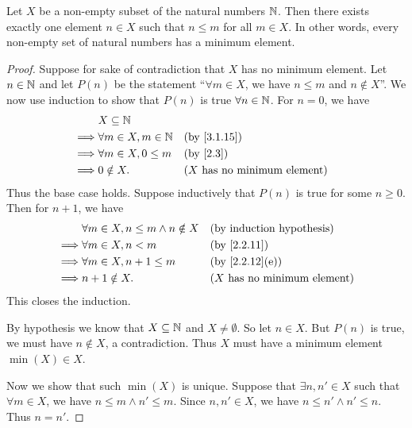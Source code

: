 \begin{prop}\label{8.1.4}
	Let \(X\) be a non-empty subset of the natural numbers \(\mathbb{N}\).
	Then there exists exactly one element \(n \in X\) such that \(n \leq m\) for all \(m \in X\).
	In other words, every non-empty set of natural numbers has a minimum element.
\end{prop}

\begin{proof}
	Suppose for sake of contradiction that \(X\) has no minimum element.
	Let \(n \in \mathbb{N}\) and let \(P(n)\) be the statement ``\(\forall m \in X\), we have \(n \leq m\) and \(n \notin X\)''.
	We now use induction to show that \(P(n)\) is true \(\forall n \in \mathbb{N}\).
	For \(n = 0\), we have
	\begin{align*}
		         & X \subseteq \N                                                       \\
		\implies & \forall m \in X, m \in \N &  & \by{3.1.15}                           \\
		\implies & \forall m \in X, 0 \leq m &  & \by{2.3}                              \\
		\implies & 0 \notin X.               &  & \text{(\(X\) has no minimum element)}
	\end{align*}
	Thus the base case holds.
	Suppose inductively that \(P(n)\) is true for some \(n \geq 0\).
	Then for \(n + 1\), we have
	\begin{align*}
		         & \forall m \in X, n \leq m \land n \notin X &  & \byIH                                 \\
		\implies & \forall m \in X, n < m                     &  & \by{2.2.11}                           \\
		\implies & \forall m \in X, n + 1 \leq m              &  & \text{(by \cref{2.2.12}(e))}          \\
		\implies & n + 1 \notin X.                            &  & \text{(\(X\) has no minimum element)}
	\end{align*}
	This closes the induction.

	By hypothesis we know that \(X \subseteq \mathbb{N}\) and \(X \neq \emptyset\).
	So let \(n \in X\).
	But \(P(n)\) is true, we must have \(n \notin X\), a contradiction.
	Thus \(X\) must have a minimum element \(\min(X) \in X\).

	Now we show that such \(\min(X)\) is unique.
	Suppose that \(\exists n, n' \in X\) such that \(\forall m \in X\), we have \(n \leq m \land n' \leq m\).
	Since \(n, n' \in X\), we have \(n \leq n' \land n' \leq n\).
	Thus \(n = n'\).
\end{proof}

